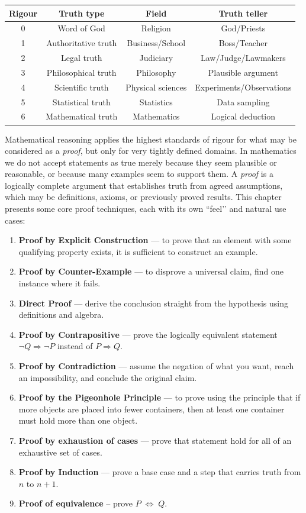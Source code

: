 \begin{table}[h]
\centering
\begin{tabular}{|c|c|c|c|}
\hline
Rigour & Truth type & Field & Truth teller  \\
\hline
0 & Word of God        & Religion          & God/Priests \\
1 & Authoritative truth & Business/School & Boss/Teacher \\
2 & Legal truth         & Judiciary         & Law/Judge/Lawmakers \\
3 & Philosophical truth & Philosophy        & Plausible argument \\
4 & Scientific truth    & Physical sciences & Experiments/Observations \\
5 & Statistical truth   & Statistics        & Data sampling \\
6 & Mathematical truth  & Mathematics       & Logical deduction \\
\hline
\end{tabular}
\end{table}
Mathematical reasoning applies the highest standards of rigour for what may be considered as a {\em proof}, but only for very tightly defined domains.
In mathematics we do not accept statements as true merely because  they seem plausible or reasonable, or because many examples seem to support them. A \emph{proof} is a logically complete argument that establishes truth from agreed assumptions, which may be definitions, axioms, or previously proved results. This chapter presents some core proof techniques, each with its own “feel’’ and natural use cases:
\begin{enumerate}
\item \textbf{Proof by Explicit Construction} — to prove that an element with some qualifying property exists, it is sufficient to construct an example.
\item \textbf{Proof by Counter-Example} — to disprove a universal claim, find one instance where it fails.
  \item \textbf{Direct Proof} — derive the conclusion straight from the hypothesis using definitions and algebra.
   \item \textbf{Proof by Contrapositive} — prove the logically equivalent statement \(\neg Q \Rightarrow \neg P\) instead of \(P \Rightarrow Q\).
  \item \textbf{Proof by Contradiction} — assume the negation of what you want, reach an impossibility, and conclude the original claim.
  \item \textbf{Proof by the Pigeonhole Principle} — to prove using the principle that if more objects are placed into fewer containers, then at least one container must hold more than one object.
  \item \textbf{Proof by exhaustion of cases} — prove that statement hold for all of an exhaustive set of cases.
   \item \textbf{Proof by Induction} — prove a base case and a step that carries truth from \(n\) to \(n{+}1\). 
   \item \textbf{Proof of equivalence} -- prove $P \; \Longleftrightarrow \;  Q$.
\end{enumerate}
